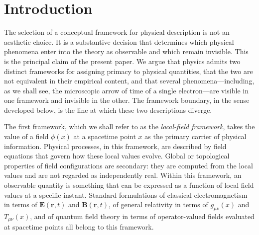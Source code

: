 \documentclass[%
 reprint, amsmath,amssymb, aps, prb, ]{revtex4-2}
\numberwithin{equation}{section}
\begin{document}
\maketitle

\section{Introduction}
\label{sec:introduction}

The selection of a conceptual framework for physical description is not an aesthetic choice. It is a substantive decision that determines which physical phenomena enter into the theory as observable and which remain invisible. This is the principal claim of the present paper. We argue that physics admits two distinct frameworks for assigning primacy to physical quantities, that the two are not equivalent in their empirical content, and that several phenomena---including, as we shall see, the microscopic arrow of time of a single electron---are visible in one framework and invisible in the other. The framework boundary, in the sense developed below, is the line at which these two descriptions diverge.

The first framework, which we shall refer to as the \emph{local-field framework}, takes the value of a field $\phi(x)$ at a spacetime point $x$ as the primary carrier of physical information. Physical processes, in this framework, are described by field equations that govern how these local values evolve. Global or topological properties of field configurations are secondary: they are computed from the local values and are not regarded as independently real. Within this framework, an observable quantity is something that can be expressed as a function of local field values at a specific instant. Standard formulations of classical electromagnetism in terms of $\mathbf{E}(\mathbf{r},t)$ and $\mathbf{B}(\mathbf{r},t)$, of general relativity in terms of $g_{\mu\nu}(x)$ and $T_{\mu\nu}(x)$, and of quantum field theory in terms of operator-valued fields evaluated at spacetime points all belong to this framework.
\end{document}
